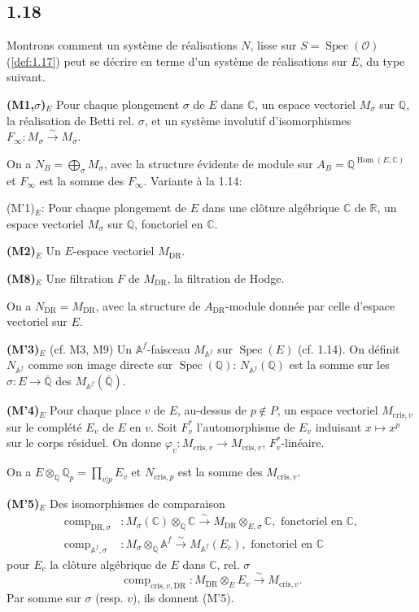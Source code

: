 \documentclass[12pt,a4paper]{article}
\theoremstyle{plain}
\theoremstyle{definition}
\theoremstyle{remark}
\DeclareMathOperator{\Spec}{Spec}
\DeclareMathOperator{\Hom}{Hom}
\providecommand{\Hom}{\operatorname{Hom}}
\providecommand{\Spec}{\operatorname{Spec}}
\providecommand{\DR}{\mathrm{DR}}
\providecommand{\cris}{\mathrm{cris}}
\providecommand{\comp}{\operatorname{comp}}
\begin{document}
\subsection*{1.18}

Montrons comment un syst\`eme de r\'ealisations $N$, lisse sur $S =
\Spec(\mathcal{O})$ (\ref{def:1.17}) peut se d\'ecrire en terme d'un syst\`eme de
r\'ealisations sur $E$, du type suivant.

\textbf{(M1,$\sigma$)$_E$} Pour chaque plongement $\sigma$ de $E$ dans $\mathbb{C}$, un
espace vectoriel $M_\sigma$ sur $\mathbb{Q}$, la r\'ealisation de Betti rel. $\sigma$, et
un syst\`eme involutif d'isomorphismes $F_\infty: M_\sigma \xrightarrow{\sim}
M_{\bar{\sigma}}$.

On a $N_B = \bigoplus_\sigma M_\sigma$, avec la structure \'evidente de module sur
$A_B = \mathbb{Q}^{\Hom(E,\mathbb{C})}$ et $F_\infty$ est la somme des
$F_\infty$. Variante \`a la 1.14:

(M'1)$_E$: Pour chaque plongement de $E$ dans une cl\^oture alg\'ebrique
$\mathbb{C}$ de $\mathbb{R}$, un espace vectoriel $M_\sigma$ sur $\mathbb{Q}$,
fonctoriel en $\mathbb{C}$.

\textbf{(M2)$_E$} Un $E$-espace vectoriel $M_{\DR}$.

\textbf{(M8)$_E$} Une filtration $F$ de $M_{\DR}$, la filtration de Hodge.

On a $N_{\DR} = M_{\DR}$, avec la structure de $A_{\DR}$-module donn\'ee par celle
d'espace vectoriel sur $E$.

\textbf{(M'3)$_E$} (cf. M3, M9) Un $\mathbb{A}^f$-faisceau $M_{\mathbb{A}^f}$ sur
$\Spec(E)$ (cf. 1.14). On d\'efinit $N_{\mathbb{A}^f}$ comme son image directe sur
$\Spec(\mathbb{Q})$: $N_{\mathbb{A}^f}(\mathbb{Q})$ est la somme sur les
$\sigma: E \to \overline{\mathbb{Q}}$ des $M_{\mathbb{A}^f}(\overline{\mathbb{Q}})$.

\textbf{(M'4)$_E$} Pour chaque place $v$ de $E$, au-dessus de $p \notin P$, un espace
vectoriel $M_{\cris,v}$ sur le compl\'et\'e $E_v$ de $E$ en $v$. Soit $F_v^*$ l'automorphisme
de $E_v$ induisant $x \mapsto x^p$ sur le corps r\'esiduel. On donne
$\varphi_v: M_{\cris,v} \to M_{\cris,v}$, $F_v^*$-lin\'eaire.

On a $E \otimes_{\mathbb{Q}} \mathbb{Q}_p = \prod_{v|p} E_v$ et $N_{\cris,p}$ est la somme
des $M_{\cris,v}$.

\textbf{(M'5)$_E$} Des isomorphismes de comparaison
\begin{align*}
\comp_{\DR,\sigma} &: M_\sigma(\mathbb{C}) \otimes_{\mathbb{Q}} \mathbb{C}
\xrightarrow{\sim} M_{\DR} \otimes_{E,\sigma} \mathbb{C}, \text{ fonctoriel en } \mathbb{C},\\
\comp_{\mathbb{A}^f,\sigma} &: M_\sigma \otimes_{\mathbb{Q}} \mathbb{A}^f
\xrightarrow{\sim} M_{\mathbb{A}^f}(E_c), \text{ fonctoriel en } \mathbb{C}
\end{align*}
pour $E_c$ la cl\^oture alg\'ebrique de $E$ dans $\mathbb{C}$, rel. $\sigma$
\[
\comp_{\cris,v,\DR}: M_{\DR} \otimes_E E_v \xrightarrow{\sim} M_{\cris,v}.
\]
Par somme sur $\sigma$ (resp. $v$), ils donnent (M'5).
\end{document}

